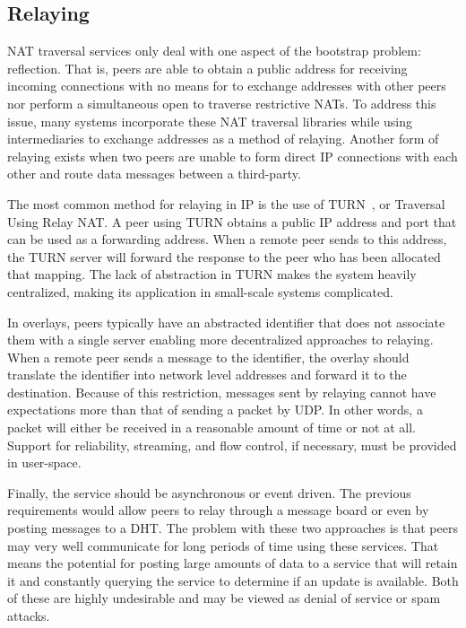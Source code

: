 \subsection{Relaying}
\label{bs:relay}

NAT traversal services only deal with one aspect of the bootstrap problem:
reflection.  That is, peers are able to obtain a public address for receiving
incoming connections with no means for to exchange addresses with other peers
nor perform a simultaneous open to traverse restrictive NATs.  To address this
issue, many systems incorporate these NAT traversal libraries while using
intermediaries to exchange addresses as a method of relaying.  Another form of
relaying exists when two peers are unable to form direct IP connections with
each other and route data messages between a third-party.

The most common method for relaying in IP is the use of TURN~\cite{turn}, or
Traversal Using Relay NAT.  A peer using TURN obtains a public IP address and
port that can be used as a forwarding address.  When a remote peer sends to
this address, the TURN server will forward the response to the peer who has
been allocated that mapping.  The lack of abstraction in TURN makes the system
heavily centralized, making its application in small-scale systems complicated.  

In overlays, peers typically have an abstracted identifier that does not
associate them with a single server enabling more decentralized approaches to
relaying.  When a remote peer sends a message to the identifier, the overlay
should translate the identifier into network level addresses and forward it to
the destination.  Because of this restriction, messages sent by relaying cannot
have expectations more than that of sending a packet by UDP.  In other words, a
packet will either be received in a reasonable amount of time or not at all.
Support for reliability, streaming, and flow control, if necessary, must be
provided in user-space.

Finally, the service should be asynchronous or event driven.  The previous
requirements would allow peers to relay through a message board or even by
posting messages to a DHT.  The problem with these two approaches is that peers
may very well communicate for long periods of time using these services.  That
means the potential for posting large amounts of data to a service that will
retain it and constantly querying the service to determine if an update is
available.  Both of these are highly undesirable and may be viewed as denial of
service or spam attacks.

